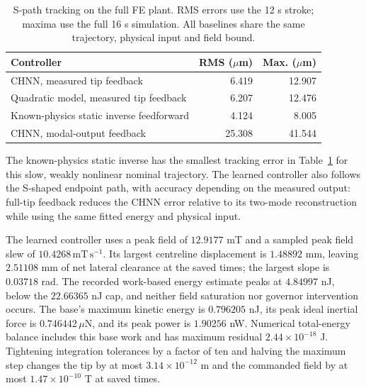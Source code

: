 \begin{table}[t]
\centering\small
\caption{S-path tracking on the full FE plant. RMS errors use the 12 s
stroke; maxima use the full 16 s simulation. All baselines share the
same trajectory, physical input and field bound.}
\label{tab:s-path}
\begin{tabular}{lrr}
\hline
Controller & RMS ($\mu$m) & Max. ($\mu$m)\\
\hline
CHNN, measured tip feedback & 6.419 & 12.907\\
Quadratic model, measured tip feedback & 6.207 & 12.476\\
Known-physics static inverse feedforward & 4.124 & 8.005\\
CHNN, modal-output feedback & 25.308 & 41.544\\
\hline
\end{tabular}
\end{table}

The known-physics static inverse has the smallest tracking error in
Table~\ref{tab:s-path} for this slow, weakly nonlinear nominal trajectory.
The learned controller also follows the S-shaped endpoint path, with
accuracy depending on the measured output: full-tip feedback reduces
the CHNN error relative to its two-mode reconstruction while using
the same fitted energy and physical input.

The learned controller uses a peak field of $12.9177$ mT and a sampled
peak field slew of $10.4268\,\mathrm{mT\,s^{-1}}$. Its largest
centreline displacement is $1.48892$ mm, leaving $2.51108$ mm of
net lateral clearance at the saved times; the largest slope is
$0.03718$ rad. The recorded work-based energy estimate peaks at $4.84997$ nJ,
below the $22.66365$ nJ cap, and neither field saturation nor governor
intervention occurs. The base's maximum kinetic energy is $0.796205$ nJ,
its peak ideal inertial force is $0.746442\,\mu$N, and its peak power
is $1.90256$ nW. Numerical total-energy balance includes this base work
and has maximum residual $2.44\times10^{-18}$ J.
Tightening integration tolerances by a factor of ten and halving the
maximum step changes the tip by at most $3.14\times10^{-12}$ m and
the commanded field by at most $1.47\times10^{-10}$ T at saved times.

